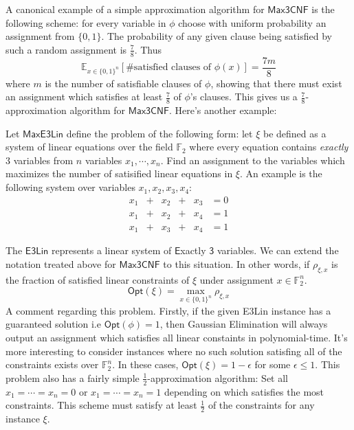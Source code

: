 A canonical example of a simple approximation algorithm for $\mathsf{Max3CNF}$ is the following scheme: for every variable in $\phi$ choose with uniform probability an assignment from $\{0,1\}$. The probability of any given clause being satisfied by such a random assignment is $\frac{7}{8}$. Thus
%
\[ \mathbb{E}_{x \in \{0,1\}^n}[\text{\# satisfied clauses of $\phi(x)$}] = \frac{7m}{8} \]
%
where $m$ is the number of satisfiable clauses of $\phi$, showing that there must exist an assignment which satisfies at least $\frac{7}{8}$ of $\phi$'s clauses. This gives us a $\frac{7}{8}$-approximation algorithm for $\mathsf{Max3CNF}$. Here's another example:
%
\begin{example} \label{e3linexample}
  Let $\mathsf{MaxE3Lin}$ define the problem of the following form: let $\xi$ be defined as a system of linear equations over the field $\mathbb{F}_2$ where every equation contains \emph{exactly} $3$ variables from $n$ variables $x_1,\cdots,x_n$. Find an assignment to the variables which maximizes the number of satisified linear equations in $\xi$. An example is the following system over variables $x_1,x_2,x_3,x_4$:
  \begin{equation*}
    \begin{alignedat}{3}
      x_1 & +{} &  x_2 & +{} & x_3 & = 0 \\
      x_1 & +{} &  x_2 & +{} &  x_4 & = 1 \\
      x_1 & +{} & x_3 & +{} & x_4 & = 1
\end{alignedat}
\end{equation*}
\end{example}
%
The $\mathsf{E3Lin}$ represents a linear system of $\mathsf{E}$xactly $\mathsf{3}$ variables. We can extend the notation treated above for $\mathsf{Max3CNF}$ to this situation. In other words, if $\rho_{\xi,x}$ is the fraction of satisfied linear constraints of $\xi$ under assignment $x \in \mathbb{F}_2^n$.
%
\[\mathsf{Opt}(\xi) =\max_{x \in \{0,1\}^n}\rho_{\xi,x}\]
%
A comment regarding this problem. Firstly, if the given E3Lin instance has a guaranteed solution i.e $\mathsf{Opt}(\phi) = 1$, then Gaussian Elimination will always output an assignment which satisfies all linear constaints in polynomial-time. It's more interesting to consider instances where no such solution satisfing all of the constraints exists over $\mathbb{F}_2^n$. In these cases, $\mathsf{Opt}(\xi) = 1 - \epsilon$ for some $\epsilon \leq 1$. This problem also has a fairly simple $\frac{1}{2}$-approximation algorithm: Set all $x_1 = \cdots = x_n  = 0$ or $x_1 = \cdots = x_n  = 1$ depending on which satisfies the most constraints. This scheme must satisfy at least $\frac{1}{2}$ of the constraints for any instance $\xi$. \newline

